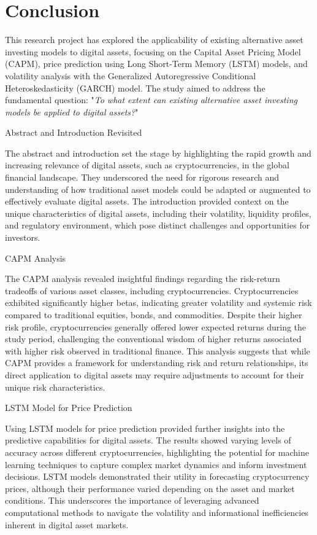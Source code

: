 \section{Conclusion}
This research project has explored the applicability of existing alternative asset investing models to digital assets, focusing on the Capital Asset Pricing Model (CAPM), price prediction using Long Short-Term Memory (LSTM) models, and volatility analysis with the Generalized Autoregressive Conditional Heteroskedasticity (GARCH) model. The study aimed to address the fundamental question: "\textit{To what extent can existing alternative asset investing models be applied to digital assets?}"

Abstract and Introduction Revisited

The abstract and introduction set the stage by highlighting the rapid growth and increasing relevance of digital assets, such as cryptocurrencies, in the global financial landscape. They underscored the need for rigorous research and understanding of how traditional asset models could be adapted or augmented to effectively evaluate digital assets. The introduction provided context on the unique characteristics of digital assets, including their volatility, liquidity profiles, and regulatory environment, which pose distinct challenges and opportunities for investors.

CAPM Analysis

The CAPM analysis revealed insightful findings regarding the risk-return tradeoffs of various asset classes, including cryptocurrencies. Cryptocurrencies exhibited significantly higher betas, indicating greater volatility and systemic risk compared to traditional equities, bonds, and commodities. Despite their higher risk profile, cryptocurrencies generally offered lower expected returns during the study period, challenging the conventional wisdom of higher returns associated with higher risk observed in traditional finance. This analysis suggests that while CAPM provides a framework for understanding risk and return relationships, its direct application to digital assets may require adjustments to account for their unique risk characteristics.

LSTM Model for Price Prediction

Using LSTM models for price prediction provided further insights into the predictive capabilities for digital assets. The results showed varying levels of accuracy across different cryptocurrencies, highlighting the potential for machine learning techniques to capture complex market dynamics and inform investment decisions. LSTM models demonstrated their utility in forecasting cryptocurrency prices, although their performance varied depending on the asset and market conditions. This underscores the importance of leveraging advanced computational methods to navigate the volatility and informational inefficiencies inherent in digital asset markets.

